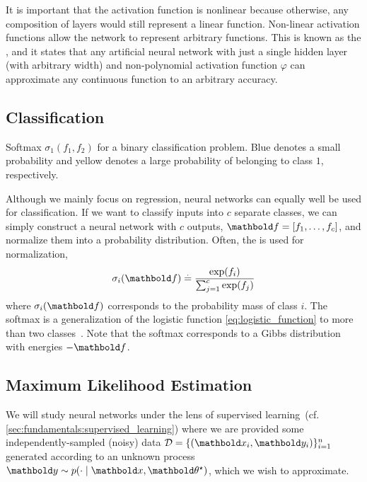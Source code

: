 It is important that the activation function is nonlinear because otherwise, any composition of layers would still represent a linear function.
Non-linear activation functions allow the network to represent arbitrary functions.
This is known as the , and it states that any artificial neural network with just a single hidden layer (with arbitrary width) and non-polynomial activation function $\varphi$ can approximate any continuous function to an arbitrary accuracy.

\subsection{Classification}\label{sec:bdl:ann:classification}

\begin{marginfigure}
  \caption{Softmax $\sigma_1(f_1, f_2)$ for a binary classification problem.
  Blue denotes a small probability and yellow denotes a large probability of belonging to class $1$, respectively.}
\end{marginfigure}

Although we mainly focus on regression, neural networks can equally well be used for classification.
If we want to classify inputs into $c$ separate classes, we can simply construct a neural network with $c$ outputs, $\vf = [f_1, \dots, f_c]$, and normalize them into a probability distribution.
Often, the  is used for normalization, \begin{align}
  \sigma_i(\vf) \defeq \frac{\exp(f_i)}{\sum_{j=1}^c \exp(f_j)} \label{eq:softmax_function}
\end{align} where $\sigma_i(\vf)$ corresponds to the probability mass of class $i$.
The softmax is a generalization of the logistic function \eqref{eq:logistic_function} to more than two classes~.
Note that the softmax corresponds to a Gibbs distribution with energies $-\vf$.

\subsection{Maximum Likelihood Estimation}\label{sec:bnn:mle}

We will study neural networks under the lens of supervised learning~(cf. \cref{sec:fundamentals:supervised_learning}) where we are provided some independently-sampled (noisy) data $\spD = \{(\vx_i, \vy_i)\}_{i=1}^n$ generated according to an unknown process $\vy \sim p(\cdot \mid \vx, \opt{\vtheta})$, which we wish to approximate.

